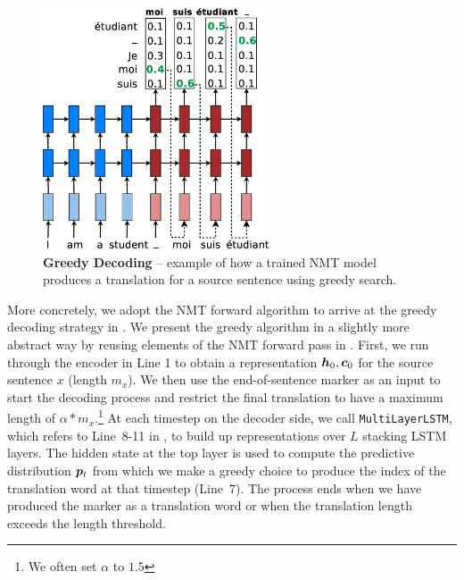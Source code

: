 \begin{figure}[tbh!]
\centering
\includegraphics[width=0.6\textwidth, clip=true, trim= 0 0 0
0]{img/nmt_test.eps} %
\caption[Neural machine translation]{{\bf Greedy Decoding}
-- example of how a trained NMT model produces a translation for a
source sentence  using greedy search.
} 
\label{f:nmt_test}
\end{figure}

More concretely, we adopt the NMT forward algorithm to arrive at the greedy
decoding strategy in . We present the greedy
algorithm in a slightly more abstract way by reusing elements of the NMT forward
pass in . First, we run through the encoder in Line 1 to obtain a
representation $\bm{h}_{0}, \bm{c}_{0}$ for the source sentence $x$ (length $m_x$). We
then use the end-of-sentence marker \word{\_} as an input to start the decoding
process and restrict the final translation to have a maximum length of
$\alpha*m_x$.\footnote{We often set $\alpha$ to $1.5$} At each timestep on the
decoder side, we call \texttt{MultiLayerLSTM}, which refers to Line~8-11 in
, to build up representations over $L$ stacking LSTM layers. The hidden
state at the top layer is used to compute the predictive distribution $\bm{p}_{t}$
from which we make a greedy choice to produce the index of the translation word
at that timestep (Line~7). The process ends when we have produced the marker
\word{\_} as a translation word or when the translation length exceeds the
length threshold.

